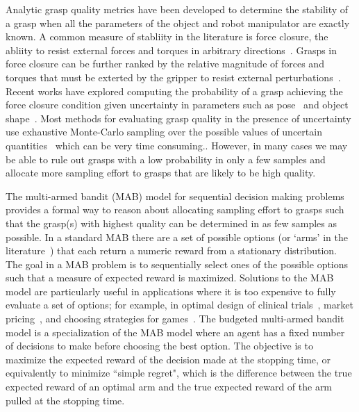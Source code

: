 \documentclass[journal,transmag]{IEEEtran}%
\begin{document}
Analytic grasp quality metrics have been developed to determine the stability of a grasp when all the parameters of the object and robot manipulator are exactly known.
A common measure of stabliity in the literature is force closure, the abliity to resist external forces and torques in arbitrary directions~\cite{}.
Grasps in force closure can be further ranked by the relative magnitude of forces and torques that must be exterted by the gripper to resist external perturbations~\cite{ferrari1992}.
Recent works have explored computing the probability of a grasp achieving the force closure condition given uncertainty in parameters such as pose~\cite{christopoulos2007handling, weisz2012pose, kim2012physically} and object shape~\cite{kehoe2012estimating, mahler2015gp}.
Most methods for evaluating grasp quality in the presence of uncertainty use exhaustive Monte-Carlo sampling over the possible values of uncertain quantities~\cite{christopoulos2007handling, kim2012physically, weisz2012pose, kehoe2012estimating, kehoe2012towards} which can be very time consuming..
However, in many cases we may be able to rule out grasps with a low probability in only a few samples and allocate more sampling effort to grasps that are likely to be high quality.

The multi-armed bandit (MAB) model for sequential decision making problems~\cite{barto1998reinforcement, lai1985asymptotically, robbins1952some} provides a formal way to reason about allocating sampling effort to grasps such that the grasp(s) with highest quality can be determined in as few samples as possible.
In a standard MAB there are a set of possible options (or `arms' in the literature~\cite{barto1998reinforcement}) that each return a numeric reward from a stationary distribution.
The goal in a MAB problem is to sequentially select ones of the possible options such that a measure of expected reward is maximized.
Solutions to the MAB model are particularly useful in applications where it is too expensive to fully evaluate a set of options; for example, in optimal design of clinical trials~\cite{simon1989optimal}, market pricing~\cite{rothschild1974two}, and choosing strategies for games~\cite{st2012online}.
The budgeted multi-armed bandit model \cite{madani2004budgeted} is a specialization of the MAB model where an agent has a fixed number of decisions to make before choosing the best option.
The objective is to maximize the expected reward of the decision made at the stopping time, or equivalently to minimize ``simple regret", which is the difference between the true expected reward of an optimal arm and the true expected reward of the arm pulled at the stopping time.
\end{document}

